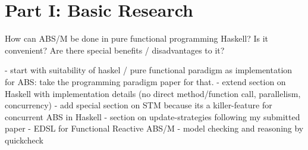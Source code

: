 \section{Part I: Basic Research}
How can ABS/M be done in pure functional programming Haskell? Is it convenient? Are there special benefits / disadvantages to it? 

- start with suitability of haskel / pure functional paradigm as implementation for ABS: take the programming paradigm paper for that.
- extend section on Haskell with implementation details (no direct method/function call, parallelism, concurrency)
- add special section on STM because its a killer-feature for concurrent ABS in Haskell
- section on update-strategies following my submitted paper
- EDSL for Functional Reactive ABS/M
- model checking and reasoning by quickcheck